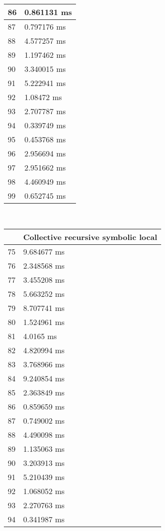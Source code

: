 \begin{multicols}{2}
\begin{tabular}{|l|l|}
		86 & 0.861131 ms \\ \hline
		87 & 0.797176 ms \\ \hline
		88 & 4.577257 ms \\ \hline
		89 & 1.197462 ms \\ \hline
		90 & 3.340015 ms \\ \hline
		91 & 5.222941 ms \\ \hline
		92 & 1.08472 ms \\ \hline
		93 & 2.707787 ms \\ \hline
		94 & 0.339749 ms \\ \hline
		95 & 0.453768 ms \\ \hline
		96 & 2.956694 ms \\ \hline
		97 & 2.951662 ms \\ \hline
		98 & 4.460949 ms \\ \hline
		99 & 0.652745 ms \\ \hline
	\end{tabular}\\
	\begin{tabular}{|l|l|}
		\hline
		& Collective recursive symbolic local \\ \hline
		75 & 9.684677 ms \\ \hline
		76 & 2.348568 ms \\ \hline
		77 & 3.455208 ms \\ \hline
		78 & 5.663252 ms \\ \hline
		79 & 8.707741 ms \\ \hline
		80 & 1.524961 ms \\ \hline
		81 & 4.0165 ms \\ \hline
		82 & 4.820994 ms \\ \hline
		83 & 3.768966 ms \\ \hline
		84 & 9.240854 ms \\ \hline
		85 & 2.363849 ms \\ \hline
		86 & 0.859659 ms \\ \hline
		87 & 0.749002 ms \\ \hline
		88 & 4.490098 ms \\ \hline
		89 & 1.135063 ms \\ \hline
		90 & 3.203913 ms \\ \hline
		91 & 5.210439 ms \\ \hline
		92 & 1.068052 ms \\ \hline
		93 & 2.270763 ms \\ \hline
		94 & 0.341987 ms \\ \hline

\end{tabular}
\end{multicols}
